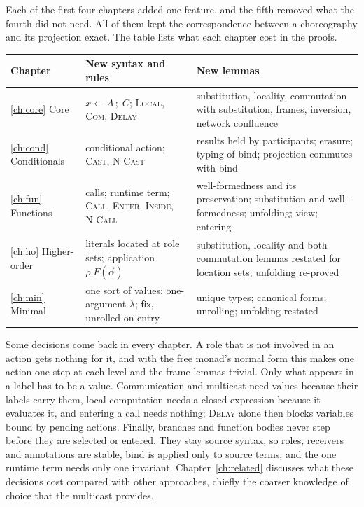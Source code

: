 \documentclass[11pt]{report}
\theoremstyle{plain}
\theoremstyle{definition}
\theoremstyle{remark}
\newcommand{\kw}[1]{\mathsf{#1}}
\newcommand{\bind}[3]{#1 \leftarrow #2\,;\;#3}
\newcommand{\rn}[1]{{\normalfont\scshape #1}}
\begin{document}
Each of the first four chapters added one feature, and the fifth removed
what the fourth did not need.  All of them kept the correspondence between
a choreography and its projection exact.  The table lists what each chapter
cost in the proofs.

\begin{center}
\renewcommand{\arraystretch}{1.25}
\begin{tabular}{p{}p{}p{}}
  \textbf{Chapter} & \textbf{New syntax and rules} & \textbf{New lemmas}\\\hline
  \ref{ch:core} Core & $\bind{x}{A}{C}$; \rn{Local}, \rn{Com}, \rn{Delay} &
    substitution, locality, commutation with substitution, frames,
    inversion, network confluence\\
  \ref{ch:cond} Conditionals & conditional action; \rn{Cast}, \rn{N-Cast} &
    results held by participants; erasure; typing of bind; projection
    commutes with bind\\
  \ref{ch:fun} Functions & calls; runtime term; \rn{Call}, \rn{Enter}, \rn{Inside}, \rn{N-Call} &
    well-formedness and its preservation; substitution and well-formedness;
    unfolding; view; entering\\
  \ref{ch:ho} Higher-order & literals located at role sets; application $\rho.F(\vec\alpha)$ &
    substitution, locality and both commutation lemmas restated for
    location sets; unfolding re-proved\\
  \ref{ch:min} Minimal & one sort of values; one-argument $\lambda$;
    $\kw{fix}$, unrolled on entry &
    unique types; canonical forms; unrolling; unfolding restated
\end{tabular}
\end{center}

Some decisions come back in every chapter.  A role that is not involved in
an action gets nothing for it, and with the free monad's normal form this
makes one action one step at each level and the frame lemmas trivial.  Only
what appears in a label has to be a value.  Communication and multicast need
values because their labels carry them, local computation needs a closed
expression because it evaluates it, and entering a call needs nothing; \rn{Delay}
alone then blocks variables bound by pending actions.  Finally, branches and
function bodies never step before they are selected or entered.  They stay
source syntax, so roles, receivers and annotations are stable, bind is
applied only to source terms, and the one runtime term needs only one
invariant.  Chapter~\ref{ch:related} discusses what these decisions cost
compared with other approaches, chiefly the coarser knowledge of choice
that the multicast provides.
\end{document}
